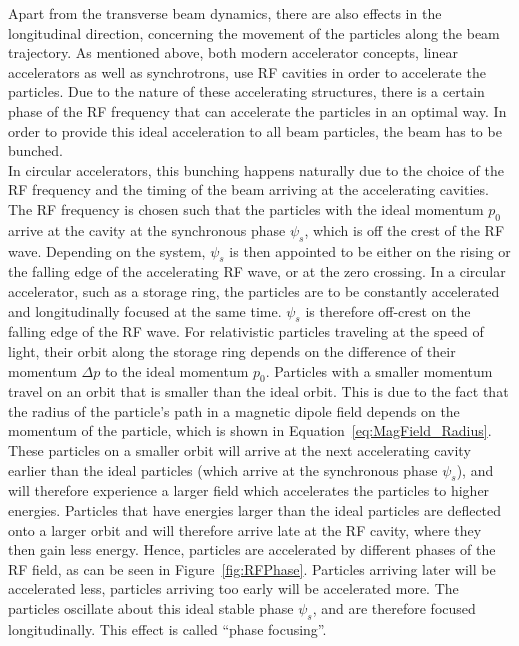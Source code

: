 Apart from the transverse beam dynamics, there are also effects in the longitudinal direction, concerning the movement of the particles along the beam trajectory.
As mentioned above, both modern accelerator concepts, linear accelerators as well as synchrotrons, use  RF cavities in order to accelerate the particles.
Due to the nature of these accelerating structures, there is a certain phase of the RF frequency that can accelerate the particles in an optimal way.
In order to provide this ideal acceleration to all beam particles, the beam has to be bunched.\\
In circular accelerators, this bunching happens naturally due to the choice of the RF frequency and the timing of the beam arriving at the accelerating cavities.
The RF frequency is chosen such that the particles with the ideal momentum $p_0$ arrive at the cavity at the synchronous phase $\psi_s$, which is off the crest of the RF wave.
Depending on the system,  $\psi_s$ is then appointed to be either on the rising or the falling edge of the accelerating RF wave, or at the zero crossing.
In a circular accelerator, such as a storage ring, the particles are to be constantly accelerated and longitudinally focused at the same time.
$\psi_s$ is therefore off-crest on the falling edge of the RF wave.
For relativistic particles traveling at the speed of light, their orbit along the storage ring depends on the difference of their momentum $\Delta p$ to the ideal momentum $p_0$.
Particles with a smaller momentum travel on an orbit that is smaller than the ideal orbit.
This is due to the fact that the radius of the particle's path in a magnetic dipole field depends on the momentum of the particle, which is shown in Equation~\ref{eq:MagField_Radius}.
These particles on a smaller orbit will arrive at the next accelerating cavity earlier than the ideal particles (which arrive at the synchronous phase $\psi_s$), and will therefore experience a larger field which accelerates the particles to higher energies.
Particles that have energies larger than the ideal particles are deflected onto a larger orbit and will therefore arrive late at the RF cavity, where they then gain less energy. 
Hence, particles are accelerated by different phases of the RF field, as can be seen in Figure~\ref{fig:RFPhase}.
Particles arriving later will be accelerated less, particles arriving too early will be accelerated more.
The particles oscillate about this ideal stable phase $\psi_s$, and are therefore focused longitudinally.
This effect is called ``phase focusing''.

